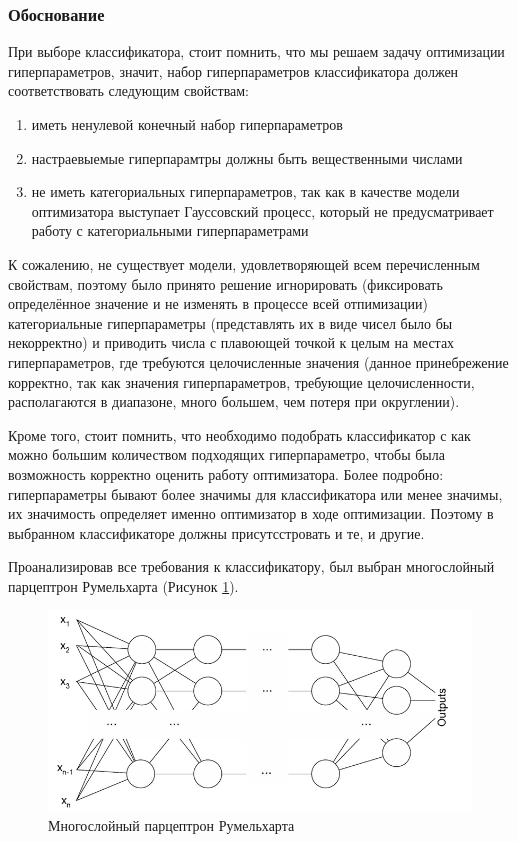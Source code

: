 \documentclass[times,specification,annotation]{itmo-student-thesis}
\begin{document}
		\subsubsection{Обоснование}
		При выборе классификатора, стоит помнить, что мы решаем задачу оптимизации гиперпараметров, значит, набор гиперпараметров классификатора должен соответствовать следующим свойствам: 
		\begin{enumerate}
			\item иметь ненулевой конечный набор гиперпараметров
			\item настраевыемые гиперпарамтры должны быть вещественными числами
			\item не иметь категориальных гиперпараметров, так как в качестве модели оптимизатора выступает Гауссовский процесс, который не предусматривает работу с категориальными гиперпараметрами
		\end{enumerate}
		К сожалению, не существует модели, удовлетворяющей всем перечисленным свойствам, поэтому было принято решение игнорировать (фиксировать определённое значение и не изменять в процессе всей отпимизации) категориальные гиперпараметры (представлять их в виде чисел было бы некорректно) и приводить числа с плавоющей точкой к целым на местах гиперпараметров, где требуются целочисленные значения (данное принебрежение корректно, так как значения гиперпараметров, требующие целочисленности, располагаются в диапазоне, много большем, чем потеря при округлении).\par
		Кроме того, стоит помнить, что необходимо подобрать классификатор с как можно большим количеством подходящих гиперпараметро, чтобы была возможность корректно оценить работу оптимизатора. Более подробно: гиперпараметры бывают более значимы для классификатора или менее значимы, их значимость определяет именно оптимизатор в ходе оптимизации. Поэтому в выбранном классификаторе должны присутсстровать и те, и другие.\par
		Проанализировав все требования к классификатору, был выбран многослойный парцептрон Румельхарта (Рисунок \ref{parceptron}).
		\begin{figure}[!ht]
			\caption{Многослойный парцептрон Румельхарта}\label{parceptron}
			\includegraphics[width=0.65\linewidth]{parceptrone}
			\centering
		\end{figure}
\end{document}
